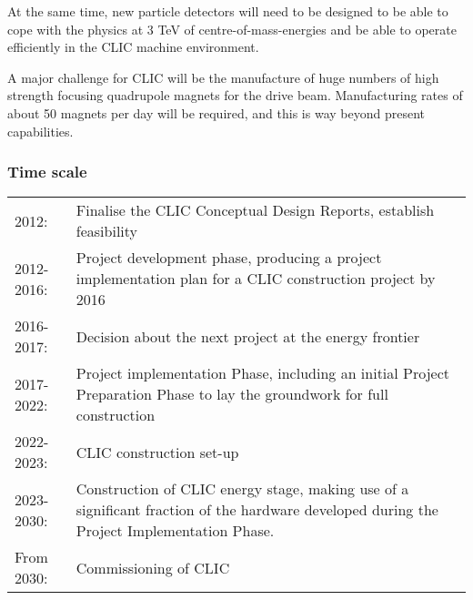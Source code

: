 At the same time, new particle detectors will need to be designed to be able to cope with the physics at 3 TeV of centre-of-mass-energies and be able to operate efficiently in the CLIC machine environment. \cite{CLIC:Concept}

A major challenge for CLIC will be the manufacture of huge numbers of high strength focusing quadrupole magnets for the drive beam. Manufacturing rates of about 50 magnets per day will be required, and this is way beyond present capabilities. \cite{CLIC:STFC}
 
\subsubsection{Time scale}

\begin{tabular}{p{2cm} p{12cm}}

2012: & Finalise the CLIC Conceptual Design Reports, establish feasibility \\
2012-2016: & Project development phase, producing a project implementation plan for a CLIC construction project by 2016 \\
2016-2017: & Decision about the next project at the energy frontier \\
2017-2022: & Project implementation Phase, including an initial Project Preparation Phase to lay the groundwork for full construction \\
2022-2023: & CLIC construction set-up \\
2023-2030: & Construction of CLIC energy stage, making use of a significant fraction of the hardware developed during the Project Implementation Phase. \\
From 2030: & Commissioning of CLIC \\

\end{tabular}



